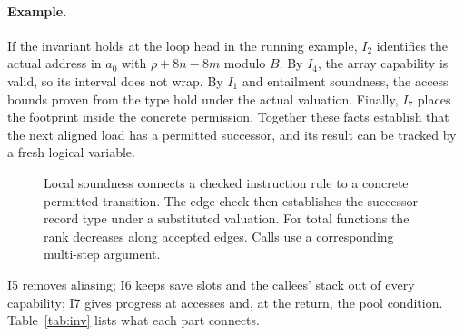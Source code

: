 \paragraph{Example.} If the invariant holds at the loop head in the running example, $I_2$ identifies the actual address in $a_0$ with $\rho+8n-8m$ modulo $B$. By $I_4$, the array capability is valid, so its interval does not wrap. By $I_1$ and entailment soundness, the access bounds proven from the type hold under the actual valuation. Finally, $I_7$ places the footprint inside the concrete permission. Together these facts establish that the next aligned load has a permitted successor, and its result can be tracked by a fresh logical variable.
\begin{figure}[t]
\centering
{}
\caption{Local soundness connects a checked instruction rule to a concrete permitted transition. The edge check then establishes the successor record type under a substituted valuation. For total functions the rank decreases along accepted edges. Calls use a corresponding multi-step argument.}
\end{figure}


I5 removes aliasing; I6 keeps save slots and the callees' stack out of every capability; I7 gives progress at accesses and, at the return, the pool condition. Table~\ref{tab:inv} lists what each part connects.

